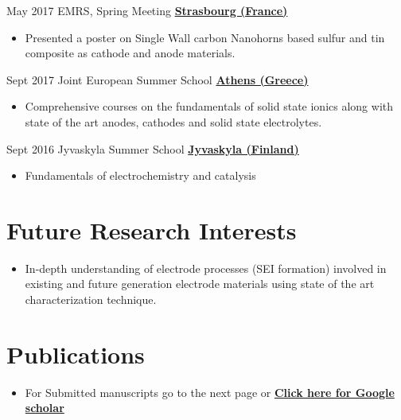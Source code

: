\documentclass[letterpaper]{twentysecondcv} %
\begin{document}
\begin{twenty} %
	\twentyitem
    	{May 2017}
        {EMRS, Spring Meeting}
        {\href{http://www.european-mrs.com/meetings/2017-spring-meeting}{\textbf{Strasbourg (France)}}}
        {}
        {
        {\begin{itemize}
        \item Presented a poster on Single Wall carbon Nanohorns based sulfur and tin composite as cathode and anode materials.
    \end{itemize}}
        }

    \twentyitem
   		{Sept 2017}
        {Joint European Summer School}
        {\href{http://www.jess-summerschool.eu/}{\textbf{Athens (Greece)}}}
        {}
        {
        {\begin{itemize}
        \item Comprehensive courses on the fundamentals of solid state ionics along with state of the art anodes, cathodes and solid state electrolytes.
    \end{itemize}}
        }

     \twentyitem
   		{Sept 2016}
        {Jyvaskyla Summer School}
        {\href{https://www.jyu.fi/science/muut_yksikot/summerschool/en}{\textbf{Jyvaskyla (Finland)}}}
        {}
        {
        \begin{itemize}
        \item Fundamentals of electrochemistry and catalysis
    \end{itemize}
    	}

\end{twenty}

\section{Future Research Interests}
{
        {\begin{itemize}
        \item In-depth understanding of electrode processes (SEI formation) involved in existing and future generation electrode materials using state of the art characterization technique.
    \end{itemize}}
        }
\section{Publications}
{
        {\begin{itemize}
        \item For Submitted manuscripts go to the next page or \href{https://scholar.google.it/citations?hl=en&user=COCauOMAAAAJ&view_op=list_works&sortby=pubdate}{\textbf{Click here for Google scholar}}\\
    \end{itemize}}
        }
\end{document}
